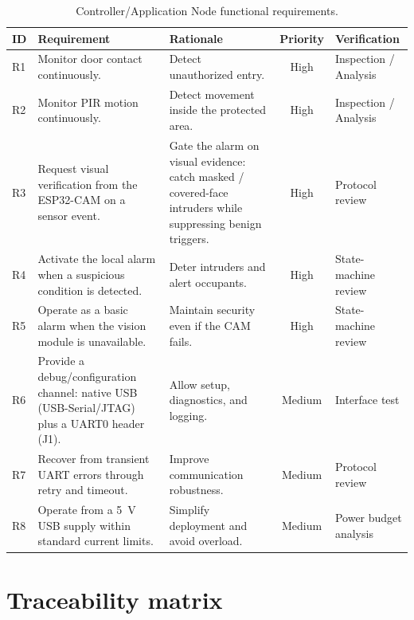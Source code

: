 \documentclass[11pt,a4paper]{article}
\begin{document}
\begin{table}[H]
    \centering
    \caption{Controller/Application Node functional requirements.}
    \label{tab:requirements}
    \begin{tabular}{>{\raggedright\arraybackslash}p{0.7cm} >{\raggedright\arraybackslash}p{3.6cm} >{\raggedright\arraybackslash}p{4.5cm} c >{\raggedright\arraybackslash}p{2.6cm}}
        \toprule
        \textbf{ID} & \textbf{Requirement} & \textbf{Rationale} & \textbf{Priority} & \textbf{Verification} \\
        \midrule
        R1 & Monitor door contact continuously. & Detect unauthorized entry. & High & Inspection / Analysis \\
        R2 & Monitor PIR motion continuously. & Detect movement inside the protected area. & High & Inspection / Analysis \\
        R3 & Request visual verification from the ESP32-CAM on a sensor event. & Gate the alarm on visual evidence: catch masked / covered-face intruders while suppressing benign triggers. & High & Protocol review \\
        R4 & Activate the local alarm when a suspicious condition is detected. & Deter intruders and alert occupants. & High & State-machine review \\
        R5 & Operate as a basic alarm when the vision module is unavailable. & Maintain security even if the CAM fails. & High & State-machine review \\
        R6 & Provide a debug/configuration channel: native USB (USB-Serial/JTAG) plus a UART0 header (J1). & Allow setup, diagnostics, and logging. & Medium & Interface test \\
        R7 & Recover from transient UART errors through retry and timeout. & Improve communication robustness. & Medium & Protocol review \\
        R8 & Operate from a 5~V USB supply within standard current limits. & Simplify deployment and avoid overload. & Medium & Power budget analysis \\
        \bottomrule
    \end{tabular}
\end{table}

\section{Traceability matrix}
\end{document}
